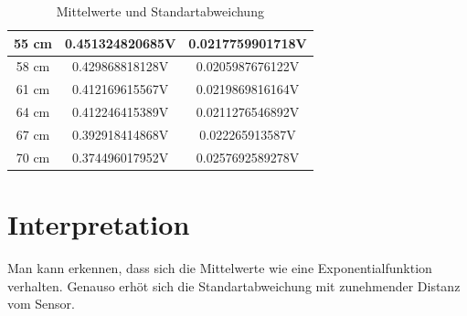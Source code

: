 \documentclass[TGAI_Laborbericht.tex]{subfiles}
\begin{document}
\begin{flushleft}
\begin{table}
\begin{tabular}{|c|c|c|}
\hline 
55 cm & 0.451324820685V
 & 0.0217759901718V
 \\ 
\hline 
58 cm & 0.429868818128V
 & 0.0205987676122V
 \\ 
\hline 
61 cm & 0.412169615567V
 & 0.0219869816164V
 \\ 
\hline 
64 cm & 0.412246415389V
 & 0.0211276546892V
 \\ 
\hline 
67 cm & 0.392918414868V
 & 0.022265913587V
 \\ 
\hline 
70 cm & 0.374496017952V
 & 0.0257692589278V
 \\ 
\hline 
\end{tabular} 
\label{Mittelwerte und Standartabweichung}
\caption{Mittelwerte und Standartabweichung}
\end{table}
\end{flushleft}

\section{Interpretation}
\label{chap:VERSUCH_1_INTERPRETATION}
Man kann erkennen, dass sich die Mittelwerte wie eine Exponentialfunktion verhalten. Genauso erhöt sich die Standartabweichung mit zunehmender Distanz vom Sensor.
\end{document}
